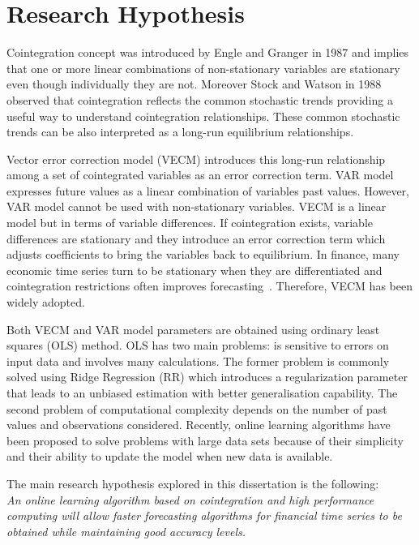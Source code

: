 \section{Research Hypothesis}


Cointegration concept was introduced by Engle and Granger in 1987
\cite{engle1987} and implies that one or more linear combinations of
non-stationary variables are stationary even though individually they are not.
Moreover Stock and Watson in 1988 \cite{stock+watson1988} observed that
cointegration reflects the common stochastic trends providing a useful way to
understand cointegration relationships. These common stochastic trends can be
also interpreted as a long-run equilibrium relationships.

Vector error correction model (VECM) introduces this long-run relationship
among a set of cointegrated variables as an error correction term. VAR model
expresses future values as a linear combination of variables past values.
However, VAR model cannot be used with non-stationary variables. VECM is a
linear model but in terms of variable differences. If cointegration exists,
variable differences are stationary and they introduce an error correction term
which adjusts coefficients to bring the variables back to equilibrium. In
finance, many economic time series turn to be stationary when they are
differentiated and cointegration restrictions often improves
forecasting~\cite{duy1998}. Therefore, VECM has been widely adopted.

Both VECM and VAR model parameters are obtained using ordinary least squares
(OLS) method. OLS has two main problems: is sensitive to errors on input data
and involves many calculations. The former problem is commonly solved using
Ridge Regression (RR) \cite{hoerl1970} which introduces a regularization
parameter that leads to an unbiased estimation with better generalisation
capability. The second problem of computational complexity depends on the number
of past values and observations considered.  Recently, online learning
algorithms have been proposed to solve problems with large data sets because of
their simplicity and their ability to update the model when new data is
available. 

The main research hypothesis explored in this dissertation is the following:
\\

\textit{An online learning algorithm based on cointegration and high
performance computing will allow faster forecasting
algorithms for financial time series to be obtained while maintaining good accuracy levels.}



